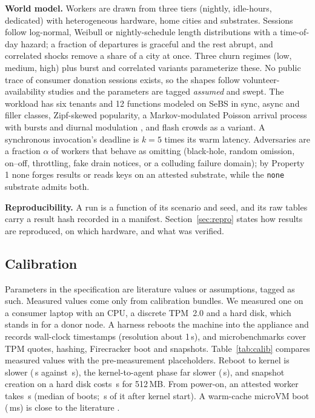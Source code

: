 \textbf{World model.} Workers are drawn from three tiers (nightly, idle-hours, dedicated) with heterogeneous hardware, home cities and substrates. Sessions follow log-normal, Weibull or nightly-schedule length distributions with a time-of-day
hazard; a fraction of departures is graceful and the rest abrupt, and correlated shocks remove a share of a city at once. Three churn regimes (low, medium, high) plus burst and correlated variants parameterize these. No public trace of
consumer donation sessions exists, so the shapes follow volunteer-availability studies \cite{javadi2013fta} and the parameters are tagged \emph{assumed} and swept. The workload has six tenants and 12 functions modeled on SeBS \cite{copik2021sebs} in sync, async and
filler classes, Zipf-skewed popularity, a Markov-modulated Poisson arrival process with bursts and diurnal modulation \cite{shahrad2020wild}, and flash crowds as a variant. A synchronous invocation's deadline is $k=5$ times its warm latency. Adversaries are
a fraction $\alpha$ of workers that behave as omitting (black-hole, random omission, on--off, throttling, fake drain notices, or a colluding failure domain); by Property 1 none forges results or reads keys on an attested substrate, while the \texttt{none} substrate
admits both.

\textbf{Reproducibility.} A run is a function of its scenario and seed, and its raw tables carry a result hash recorded in a manifest. Section~\ref{sec:repro} states how results are reproduced, on which hardware, and what was verified.

\subsection{Calibration}
\label{sec:calib}
Parameters in the specification are literature values or assumptions, tagged as such. Measured values come only from calibration bundles. We measured one on a consumer laptop with an \CalCpu{} CPU, a discrete TPM~2.0 and a hard disk, which stands in
for a donor node. A harness reboots the machine into the appliance and records wall-clock timestamps (resolution about 1\,s), and microbenchmarks cover TPM quotes, hashing, Firecracker boot and snapshots. Table~\ref{tab:calib} compares measured values with the
pre-measurement placeholders. Reboot to kernel is slower (\CalReboot\,s against \CalRebootPh\,s), the kernel-to-agent phase far slower (\CalUserspace\,s), and snapshot creation on a hard disk costs \CalSnapCreate\,s for 512\,MB. From power-on, an attested worker takes \CalAttested\,s
(median of \CalAttestedN{} boots; \CalAttestedKernel\,s of it after kernel start). A warm-cache microVM boot (\CalFcBootWarmMs\,ms) is close to the literature \cite{agache2020firecracker}.

